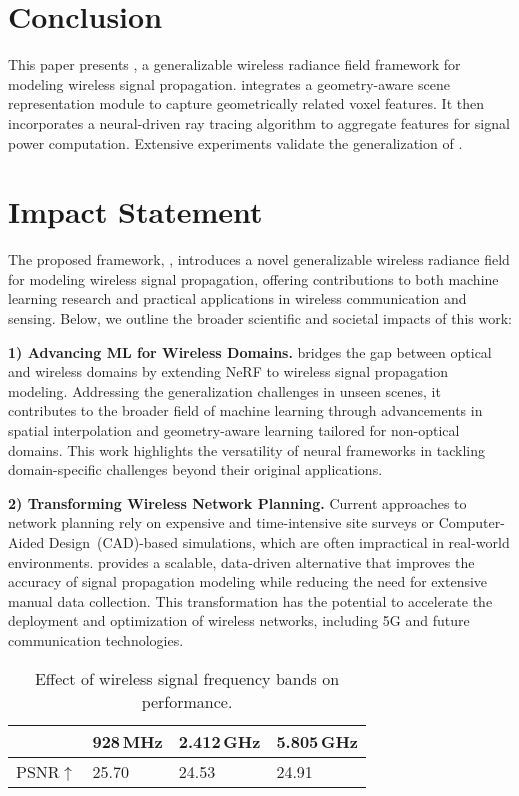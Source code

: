 \section{Conclusion}\label{sec_conclusion}
This paper presents \ourSystem, a generalizable wireless radiance field framework for modeling wireless signal propagation. 
\ourSystem integrates a geometry-aware scene representation module to capture geometrically related voxel features. 
It then incorporates a neural-driven ray tracing algorithm to aggregate features for signal power computation. 
Extensive experiments validate the generalization of \ourSystem.




\section{Impact Statement}\label{sec_impact}

The proposed framework, \ourSystem, introduces a novel generalizable wireless radiance field for modeling wireless signal propagation, offering contributions to both machine learning research and practical applications in wireless communication and sensing. 
Below, we outline the broader scientific and societal impacts of this work:

\textbf{1) Advancing ML for Wireless Domains.}
\ourSystem bridges the gap between optical and wireless domains by extending NeRF to wireless signal propagation modeling. 
Addressing the generalization challenges in unseen scenes, it contributes to the broader field of machine learning through advancements in spatial interpolation and geometry-aware learning tailored for non-optical domains. 
This work highlights the versatility of neural frameworks in tackling domain-specific challenges beyond their original applications.



\textbf{2) Transforming Wireless Network Planning.}
Current approaches to network planning rely on expensive and time-intensive site surveys or Computer-Aided Design~(CAD)-based simulations, which are often impractical in real-world environments. 
\ourSystem provides a scalable, data-driven alternative that improves the accuracy of signal propagation modeling while reducing the need for extensive manual data collection. 
This transformation has the potential to accelerate the deployment and optimization of wireless networks, including 5G and future communication technologies.

\begin{table}[t]
\centering
\caption{Effect of wireless signal frequency bands on performance.}
\begin{tabular}{L{0.75in}C{0.6in}C{0.6in}C{0.6in}}
\toprule
     & 928\,MHz  & 2.412\,GHz & 5.805\,GHz     \\ 
  \midrule
PSNR$\uparrow$  & 25.70  & 24.53 & 24.91    \\ 
\bottomrule
\end{tabular}
\label{table_para_material}
\end{table}


